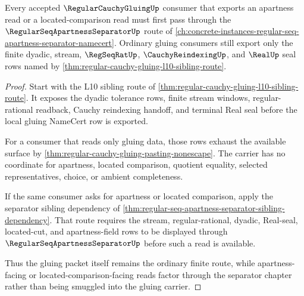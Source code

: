 \begin{theorem}
\label{thm:regular-cauchy-gluing-separator-use-route}
Every accepted $\RegularCauchyGluingUp$ consumer that exports an apartness read or a located-comparison read must first pass through the $\RegularSeqApartnessSeparatorUp$ route of \autoref{ch:concrete-instances-regular-seq-apartness-separator-namecert}. Ordinary gluing consumers still export only the finite dyadic, stream, $\RegSeqRatUp$, $\CauchyReindexingUp$, and $\RealUp$ seal rows named by \autoref{thm:regular-cauchy-gluing-l10-sibling-route}.
\end{theorem}
\begin{proof}
Start with the L10 sibling route of \autoref{thm:regular-cauchy-gluing-l10-sibling-route}. It exposes the dyadic tolerance rows, finite stream windows, regular-rational readback, Cauchy reindexing handoff, and terminal Real seal before the local gluing NameCert row is exported.

For a consumer that reads only gluing data, those rows exhaust the available surface by \autoref{thm:regular-cauchy-gluing-pasting-nonescape}. The carrier has no coordinate for apartness, located comparison, quotient equality, selected representatives, choice, or ambient completeness.

If the same consumer asks for apartness or located comparison, apply the separator sibling dependency of \autoref{thm:regular-seq-apartness-separator-sibling-dependency}. That route requires the stream, regular-rational, dyadic, Real-seal, located-cut, and apartness-field rows to be displayed through $\RegularSeqApartnessSeparatorUp$ before such a read is available.

Thus the gluing packet itself remains the ordinary finite route, while apartness-facing or located-comparison-facing reads factor through the separator chapter rather than being smuggled into the gluing carrier.
\end{proof}

